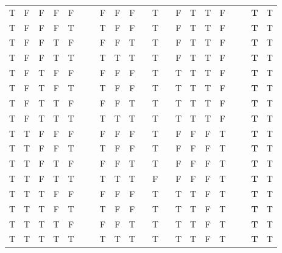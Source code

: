 \documentclass[a4paper,12pt]{article}
\begin{document}
\begin{enumerate}[label=\arabic*,leftmargin=*]
\begin{enumerate}[label=\arabic*.]
\begin{minipage}{\textwidth}
\begin{tabular}{c c c c c | c c c c c c c c c c c c c c c c}
                        T & F & F & F & F &   &   & F & F  & F &   & T   &   & F & T & T  & F &   &   & \textbf{T} & T\\
                        T & F & F & F & T &   &   & T & F  & F &   & T   &   & F & T & T  & F &   &   & \textbf{T} & T\\
                        T & F & F & T & F &   &   & F & F  & T &   & T   &   & F & T & T  & F &   &   & \textbf{T} & T\\
                        T & F & F & T & T &   &   & T & T  & T &   & T   &   & F & T & T  & F &   &   & \textbf{T} & T\\
                        T & F & T & F & F &   &   & F & F  & F &   & T   &   & T & T & T  & F &   &   & \textbf{T} & T\\
                        T & F & T & F & T &   &   & T & F  & F &   & T   &   & T & T & T  & F &   &   & \textbf{T} & T\\
                        T & F & T & T & F &   &   & F & F  & T &   & T   &   & T & T & T  & F &   &   & \textbf{T} & T\\
                        T & F & T & T & T &   &   & T & T  & T &   & T   &   & T & T & T  & F &   &   & \textbf{T} & T\\
                        T & T & F & F & F &   &   & F & F  & F &   & T   &   & F & F & F  & T &   &   & \textbf{T} & T\\
                        T & T & F & F & T &   &   & T & F  & F &   & T   &   & F & F & F  & T &   &   & \textbf{T} & T\\
                        T & T & F & T & F &   &   & F & F  & T &   & T   &   & F & F & F  & T &   &   & \textbf{T} & T\\
                        T & T & F & T & T &   &   & T & T  & T &   & F   &   & F & F & F  & T &   &   & \textbf{T} & T\\
                        T & T & T & F & F &   &   & F & F  & F &   & T   &   & T & T & F  & T &   &   & \textbf{T} & T\\
                        T & T & T & F & T &   &   & T & F  & F &   & T   &   & T & T & F  & T &   &   & \textbf{T} & T\\
                        T & T & T & T & F &   &   & F & F  & T &   & T   &   & T & T & F  & T &   &   & \textbf{T} & T\\
                        T & T & T & T & T &   &   & T & T  & T &   & T   &   & T & T & F  & T &   &   & \textbf{T} & T\\
                    \end{tabular}
                    \vspace{1em}
                \end{minipage}

        \end{enumerate}
    \end{enumerate}
\end{document}
